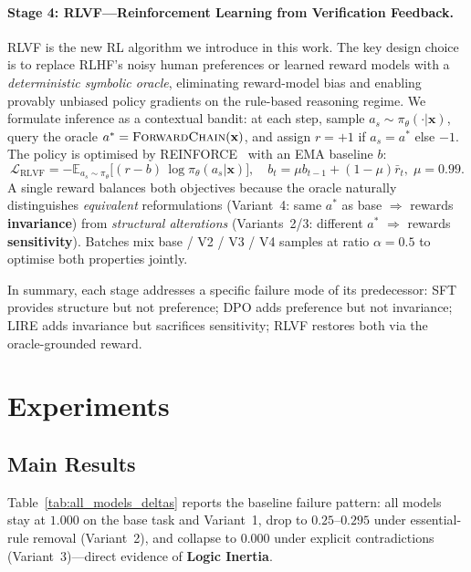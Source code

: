 \documentclass{article} %
\begin{document}
\paragraph{Stage 4: \textsc{RLVF}---Reinforcement Learning from Verification Feedback.}
\textsc{RLVF} is the new RL algorithm we introduce in this work. The key design choice is to replace RLHF's noisy human preferences or learned reward models with a \emph{deterministic symbolic oracle}, eliminating reward-model bias and enabling provably unbiased policy gradients on the rule-based reasoning regime. We formulate inference as a contextual bandit: at each step, sample $a_s\sim\pi_\theta(\cdot|\mathbf{x})$, query the oracle $a^*=\textsc{ForwardChain}(\mathbf{x})$, and assign $r=+1$ if $a_s=a^*$ else $-1$. The policy is optimised by REINFORCE~\citep{williams1992simple} with an EMA baseline $b$:
\begin{equation}
\mathcal{L}_{\mathrm{RLVF}} = -\mathbb{E}_{a_s \sim \pi_\theta}\bigl[(r - b)\,\log\pi_\theta(a_s|\mathbf{x})\bigr],\quad b_t = \mu b_{t-1} + (1-\mu)\bar r_t,\;\mu=0.99.
\label{eq:rlvf}
\end{equation}
A single reward balances both objectives because the oracle naturally distinguishes \emph{equivalent} reformulations (Variant~4: same $a^*$ as base $\Rightarrow$ rewards \textbf{invariance}) from \emph{structural alterations} (Variants~2/3: different $a^*$ $\Rightarrow$ rewards \textbf{sensitivity}). Batches mix base / V2 / V3 / V4 samples at ratio $\alpha=0.5$ to optimise both properties jointly.

In summary, each stage addresses a specific failure mode of its predecessor: SFT provides structure but not preference; DPO adds preference but not invariance; LIRE adds invariance but sacrifices sensitivity; RLVF restores both via the oracle-grounded reward.

\section{Experiments}

\subsection{Main Results}
Table~\ref{tab:all_models_deltas} reports the baseline failure pattern: all models stay at $1.000$ on the base task and Variant~1, drop to $0.25$--$0.295$ under essential-rule removal (Variant~2), and collapse to $0.000$ under explicit contradictions (Variant~3)---direct evidence of \textbf{Logic Inertia}.
\end{document}
